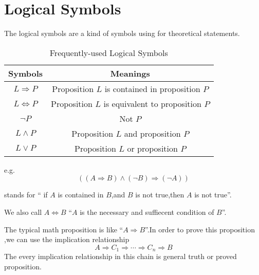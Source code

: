 \section{Logical Symbols}
The logical symbols are a kind of symbols using for theoretical statements.
    \begin{table}[H]
        \centering
        \caption{Frequently-used Logical Symbols}
        \begin{tabular}{|c|c|}\hline
            Symbols&Meanings\\\hline
            $L\Longrightarrow P$& Proposition $L$ is contained in proposition $P$\\
            $L \Longleftrightarrow P $&Proposition $L$ is equivalent to proposition $P$\\
            $\lnot P$&Not $P$\\
            $L\wedge P$&Proposition $L$ and proposition $P$\\
            $L \vee P$&Proposition $L$ or proposition $P$\\
            \hline
        \end{tabular}
    \end{table}
e.g.\[((A\Longrightarrow B)\wedge(\lnot B)\Longrightarrow (\lnot A) )\]


stands for `` if $A$ is contained in  $B$,and $B$ is not true,then $A$ is not true''.

We also call $ A \Longleftrightarrow B$ ``$A$ is the necessary and suffiecent condition of $B$''.

The typical math proposition is like ``$A\Longrightarrow B$''.In order to prove this proposition ,we can use the  implication relationship \[A\Longrightarrow C_1\Longrightarrow \cdots \Longrightarrow C_n\Longrightarrow B\]The every implication relationship in this chain is general truth or proved proposition.

